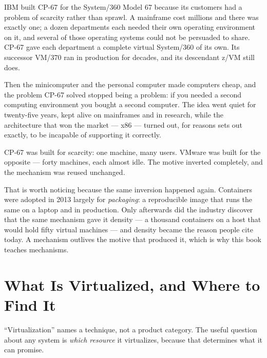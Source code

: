IBM built CP-67 for the System/360 Model 67 because its customers had a problem
of scarcity rather than sprawl. A mainframe cost millions and there was exactly
one; a dozen departments each needed their own operating environment on it, and
several of those operating systems could not be persuaded to share. CP-67 gave
each department a complete virtual System/360 of its own. Its successor VM/370
ran in production for decades, and its descendant z/VM still does.

Then the minicomputer and the personal computer made computers cheap, and the
problem CP-67 solved stopped being a problem: if you needed a second computing
environment you bought a second computer. The idea went quiet for twenty-five
years, kept alive on mainframes and in research, while the architecture that won
the market --- x86 --- turned out, for reasons  sets out exactly, to
be incapable of supporting it correctly.

\begin{conceptbox}
CP-67 was built for scarcity: one machine, many users. VMware was built for the
opposite --- forty machines, each almost idle. The motive inverted completely,
and the mechanism was reused unchanged.

\smallskip
That is worth noticing because the same inversion happened again. Containers
were adopted in 2013 largely for \emph{packaging}: a reproducible image that
runs the same on a laptop and in production. Only afterwards did the industry
discover that the same mechanism gave it density --- a thousand containers on a
host that would hold fifty virtual machines --- and density became the reason
people cite today. A mechanism outlives the motive that produced it, which is
why this book teaches mechanisms.
\end{conceptbox}

\section{What Is Virtualized, and Where to Find It}

``Virtualization'' names a technique, not a product category. The useful
question about any system is \emph{which resource} it virtualizes, because that
determines what it can promise.

